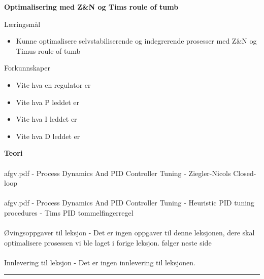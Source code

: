 \centerline{\bf Optimalisering med Z\&N og Tims roule of tumb}  \bigskip
	Læringsmål
	\begin{itemize}[noitemsep]
		\item Kunne optimalisere selvstabiliserende og indegrerende prosesser med Z\&N og Timus roule of tumb
	\end{itemize}

	Forkunnskaper

	\begin{itemize}[noitemsep]
		\item Vite hva en regulator er
		\item Vite hva P leddet er
		\item Vite hva I leddet er
		\item Vite hva D leddet er

	\end{itemize}
\textbf{Teori}\\\\
afgv.pdf - Process Dynamics And PID Controller Tuning - Ziegler-Nicols Closed-loop\\\\
afgv.pdf - Process Dynamics And PID Controller Tuning - Heuristic PID tuning procedures - Tims PID tommelfingerregel\\\\
Øvingsoppgaver til leksjon - Det er ingen oppgaver til denne leksjonen, dere skal optimalisere prosessen vi ble laget i forige leksjon. følger neste side\\\\
Innlevering til leksjon - Det er ingen innlevering til leksjonen. 
\bigskip 
\hrule
\vfil \eject
